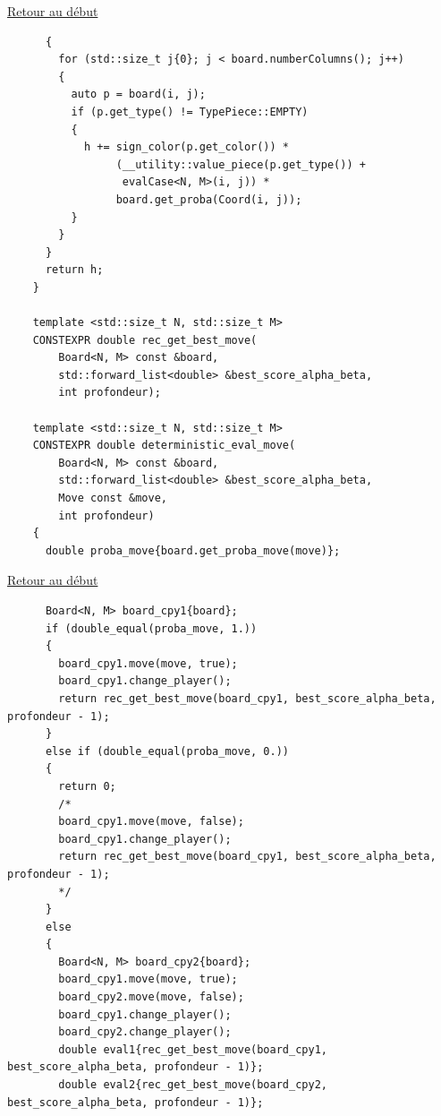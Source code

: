 {\begin{frame}[fragile]
\hyperlink{conclusion}{Retour au début}\newline
\begin{verbatim}
      {
        for (std::size_t j{0}; j < board.numberColumns(); j++)
        {
          auto p = board(i, j);
          if (p.get_type() != TypePiece::EMPTY)
          {
            h += sign_color(p.get_color()) *
                 (__utility::value_piece(p.get_type()) +
                  evalCase<N, M>(i, j)) *
                 board.get_proba(Coord(i, j));
          }
        }
      }
      return h;
    }

    template <std::size_t N, std::size_t M>
    CONSTEXPR double rec_get_best_move(
        Board<N, M> const &board,
        std::forward_list<double> &best_score_alpha_beta,
        int profondeur);

    template <std::size_t N, std::size_t M>
    CONSTEXPR double deterministic_eval_move(
        Board<N, M> const &board,
        std::forward_list<double> &best_score_alpha_beta,
        Move const &move,
        int profondeur)
    {
      double proba_move{board.get_proba_move(move)};
\end{verbatim}
\end{frame}

\begin{frame}[fragile]
\hyperlink{conclusion}{Retour au début}\newline
\begin{verbatim}
      Board<N, M> board_cpy1{board};
      if (double_equal(proba_move, 1.))
      {
        board_cpy1.move(move, true);
        board_cpy1.change_player();
        return rec_get_best_move(board_cpy1, best_score_alpha_beta, profondeur - 1);
      }
      else if (double_equal(proba_move, 0.))
      {
        return 0;
        /*
        board_cpy1.move(move, false);
        board_cpy1.change_player();
        return rec_get_best_move(board_cpy1, best_score_alpha_beta, profondeur - 1);
        */
      }
      else
      {
        Board<N, M> board_cpy2{board};
        board_cpy1.move(move, true);
        board_cpy2.move(move, false);
        board_cpy1.change_player();
        board_cpy2.change_player();
        double eval1{rec_get_best_move(board_cpy1, best_score_alpha_beta, profondeur - 1)};
        double eval2{rec_get_best_move(board_cpy2, best_score_alpha_beta, profondeur - 1)};


\end{verbatim}
\end{frame}}
